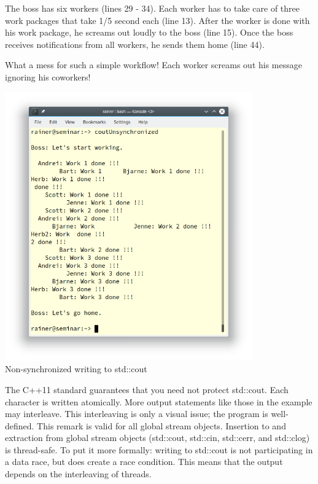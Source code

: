 The boss has six workers (lines 29 - 34). Each worker has to take care of three work packages that take 1/5 second each (line 13). After the worker is done with his work package, he screams out loudly to the boss (line 15). Once the boss receives notifications from all workers, he sends them home (line 44).

What a mess for such a simple workflow! Each worker screams out his message ignoring his coworkers!

\begin{center}
\includegraphics[width=0.8\textwidth]{content/3/chapter6/images/29.png}\\
Non-synchronized writing to std::cout
\end{center}

\begin{tcolorbox}[colback=blue!5!white,colframe=blue!75!black,title={std::cout is thread-safe}]
	
The C++11 standard guarantees that you need not protect std::cout. Each character is written atomically. More output statements like those in the example may interleave. This interleaving is only a visual issue; the program is well-defined. This remark is valid for all global stream objects. Insertion to and extraction from global stream objects (std::cout, std::cin, std::cerr, and std::clog) is thread-safe. To put it more formally: writing to std::cout is not participating in a data race, but does create a race condition. This means that the output depends on the interleaving of threads.
	
\end{tcolorbox}

